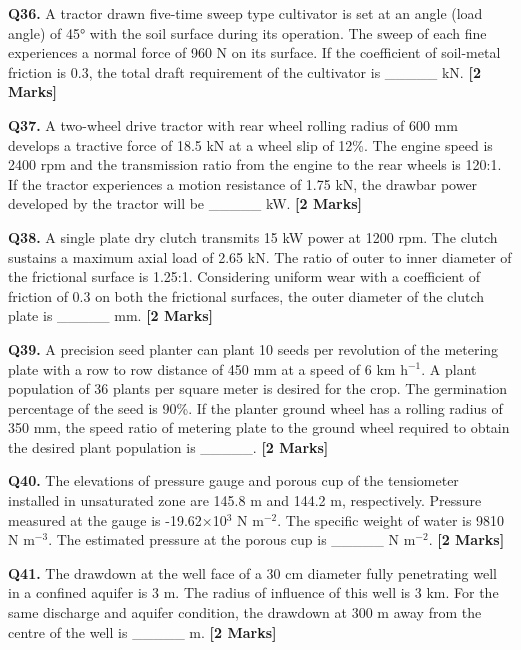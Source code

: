 \documentclass[11pt]{article}
\newcommand{\questionb}[2]{
    \noindent\textbf{Q#2.} #1 \hfill \textbf{[2 Marks]}
}
\begin{document}
\questionb{A tractor drawn five-time sweep type cultivator is set at an angle (load angle) of 45° with the soil surface during its operation. The sweep of each fine experiences a normal force of 960 N on its surface. If the coefficient of soil-metal friction is 0.3, the total draft requirement of the cultivator is \_\_\_\_\_ kN.}{36}
\vspace{0.5cm}

\questionb{A two-wheel drive tractor with rear wheel rolling radius of 600 mm develops a tractive force of 18.5 kN at a wheel slip of 12\%. The engine speed is 2400 rpm and the transmission ratio from the engine to the rear wheels is 120:1. If the tractor experiences a motion resistance of 1.75 kN, the drawbar power developed by the tractor will be \_\_\_\_\_ kW.}{37}
\vspace{0.5cm}

\questionb{A single plate dry clutch transmits 15 kW power at 1200 rpm. The clutch sustains a maximum axial load of 2.65 kN. The ratio of outer to inner diameter of the frictional surface is 1.25:1. Considering uniform wear with a coefficient of friction of 0.3 on both the frictional surfaces, the outer diameter of the clutch plate is \_\_\_\_\_ mm.}{38}
\vspace{0.5cm}

\questionb{A precision seed planter can plant 10 seeds per revolution of the metering plate with a row to row distance of 450 mm at a speed of 6 km h\(^{-1}\). A plant population of 36 plants per square meter is desired for the crop. The germination percentage of the seed is 90\%. If the planter ground wheel has a rolling radius of 350 mm, the speed ratio of metering plate to the ground wheel required to obtain the desired plant population is \_\_\_\_\_.}{39}
\vspace{0.5cm}

\questionb{The elevations of pressure gauge and porous cup of the tensiometer installed in unsaturated zone are 145.8 m and 144.2 m, respectively. Pressure measured at the gauge is -19.62×10\(^3\) N m\(^{-2}\). The specific weight of water is 9810 N m\(^{-3}\). The estimated pressure at the porous cup is \_\_\_\_\_ N m\(^{-2}\).}{40}
\vspace{0.5cm}

\questionb{The drawdown at the well face of a 30 cm diameter fully penetrating well in a confined aquifer is 3 m. The radius of influence of this well is 3 km. For the same discharge and aquifer condition, the drawdown at 300 m away from the centre of the well is \_\_\_\_\_ m.}{41}
\vspace{0.5cm}
\end{document}
